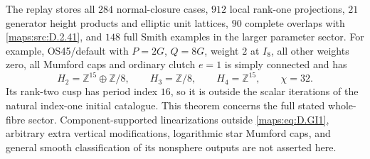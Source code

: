 The replay 
stores all $284$ normal-closure cases, $912$ local
rank-one projections, $21$ generator height products
and elliptic unit lattices, $90$ complete overlaps
with \ref{maps:src:D.2.41}, and $148$ full Smith examples in the
larger parameter sector. For example, OS45/default
with $P=2G$, $Q=8G$, weight $2$ at $I_8$, all other
weights zero, all Mumford caps and ordinary clutch
$e=1$ is simply connected and has
\[
 H_2=\mathbb Z^{15}\oplus\mathbb Z/8,\qquad
 H_3=\mathbb Z/8,\qquad H_4=\mathbb Z^{15},\qquad\chi=32.
\]
Its rank-two cusp has period index $16$, so it is
outside the scalar iterations of the natural
index-one initial catalogue. This theorem concerns
the full stated whole-fibre sector. Component-supported
linearizations outside \eqref{maps:eq:D.GI1}, arbitrary extra
vertical modifications, logarithmic star Mumford
caps, and general smooth classification of its
nonsphere outputs are not asserted here.


